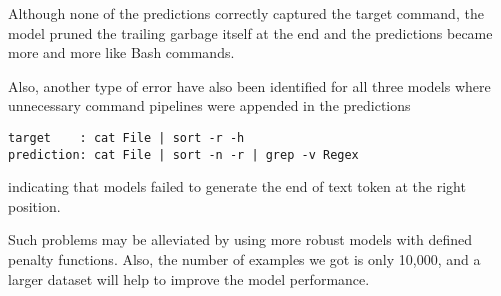 Although none of the predictions correctly captured the target command, the model pruned the trailing garbage itself at the end and the predictions became more and more like Bash commands.

Also, another type of error have also been identified for all three models where unnecessary command pipelines were appended in the predictions
\begin{verbatim}
target    : cat File | sort -r -h 
prediction: cat File | sort -n -r | grep -v Regex
\end{verbatim}
indicating that models failed to generate the end of text token at the right position.

Such problems may be alleviated by using more robust models with defined penalty functions. Also, the number of examples we got is only 10,000, and a larger dataset will help to improve the model performance.